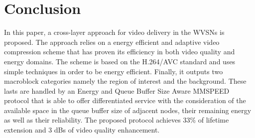 \documentclass[conference,a4paper]{IEEEtran}
\begin{document}
\section{Conclusion}
\label{conclu}
In this paper, a cross-layer approach for video delivery in the WVSNs is proposed. The approach relies on a energy efficient and adaptive video compression scheme that has proven its efficiency in both video quality and energy domains. The scheme is based on the H.264/AVC standard and uses simple techniques in order to be energy efficient. Finally, it outputs two macroblock categories namely the region of interest and the background. These lasts are handled by an Energy and Queue Buffer Size Aware MMSPEED protocol that is able to offer differentiated service with the consideration of the available space in the queue buffer size of adjacent nodes, their remaining energy as well as their reliability. The proposed protocol achieves 33\% of lifetime extension and 3 dBs of video quality enhancement.










































\end{document}
